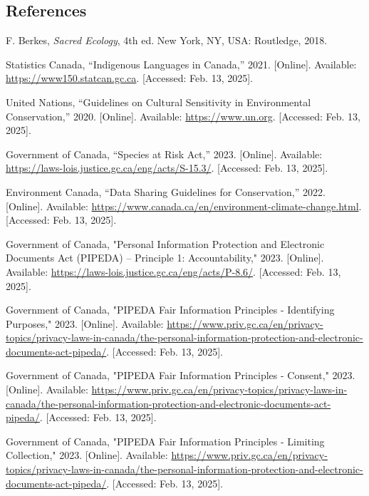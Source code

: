 \documentclass[]{article}
\begin{document}
\subsection{References}
\label{sub:references}
\begin{thebibliography}{9}

     F. Berkes, \textit{Sacred Ecology}, 4th ed. New York, NY, USA: Routledge, 2018.

     Statistics Canada, “Indigenous Languages in Canada,” 2021. [Online]. Available: \url{https://www150.statcan.gc.ca}. [Accessed: Feb. 13, 2025].

     United Nations, “Guidelines on Cultural Sensitivity in Environmental Conservation,” 2020. [Online]. Available: \url{https://www.un.org}. [Accessed: Feb. 13, 2025].

     Government of Canada, “Species at Risk Act,” 2023. [Online]. Available: \url{https://laws-lois.justice.gc.ca/eng/acts/S-15.3/}. [Accessed: Feb. 13, 2025].

     Environment Canada, “Data Sharing Guidelines for Conservation,” 2022. [Online]. Available: \url{https://www.canada.ca/en/environment-climate-change.html}. [Accessed: Feb. 13, 2025].

     Government of Canada, "Personal Information Protection and Electronic Documents Act (PIPEDA) – Principle 1: Accountability," 2023. [Online]. Available: \url{https://laws-lois.justice.gc.ca/eng/acts/P-8.6/}. [Accessed: Feb. 13, 2025].

     Government of Canada, "PIPEDA Fair Information Principles - Identifying Purposes," 2023. [Online]. Available: \url{https://www.priv.gc.ca/en/privacy-topics/privacy-laws-in-canada/the-personal-information-protection-and-electronic-documents-act-pipeda/}. [Accessed: Feb. 13, 2025].

     Government of Canada, "PIPEDA Fair Information Principles - Consent," 2023. [Online]. Available: \url{https://www.priv.gc.ca/en/privacy-topics/privacy-laws-in-canada/the-personal-information-protection-and-electronic-documents-act-pipeda/}. [Accessed: Feb. 13, 2025].

     Government of Canada, "PIPEDA Fair Information Principles - Limiting Collection," 2023. [Online]. Available: \url{https://www.priv.gc.ca/en/privacy-topics/privacy-laws-in-canada/the-personal-information-protection-and-electronic-documents-act-pipeda/}. [Accessed: Feb. 13, 2025].


\end{thebibliography}
\end{document}
